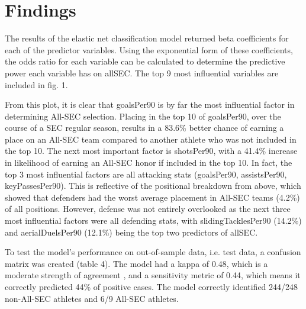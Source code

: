 \documentclass{article}
\begin{document}
\section{Findings}
The results of the elastic net classification model returned beta coefficients for each of the predictor variables. Using the exponential form of these coefficients, the odds ratio for each variable can be calculated to determine the predictive power each variable has on allSEC. The top 9 most influential variables are included in fig. 1.

From this plot, it is clear that goalsPer90 is by far the most influential factor in determining All-SEC selection. Placing in the top 10 of goalsPer90, over the course of a SEC regular season, results in a 83.6\% better chance of earning a place on an All-SEC team compared to another athlete who was not included in the top 10. The next most important factor is shotsPer90, with a 41.4\% increase in likelihood of earning an All-SEC honor if included in the top 10. In fact, the top 3 most influential factors are all attacking stats (goalsPer90, assistsPer90, keyPassesPer90). This is reflective of the positional breakdown from above, which showed that defenders had the worst average placement in All-SEC teams (4.2\%) of all positions. However, defense was not entirely overlooked as the next three most influential factors were all defending stats, with slidingTacklesPer90 (14.2\%) and aerialDuelsPer90 (12.1\%) being the top two predictors of allSEC. 

To test the model’s performance on out-of-sample data, i.e. test data, a confusion matrix was created (table 4). The model had a kappa of 0.48, which is a moderate strength of agreement \cite{landis1977}, and a sensitivity metric of 0.44, which means it correctly predicted 44\% of positive cases. The model correctly identified 244/248 non-All-SEC athletes and 6/9 All-SEC athletes. 
\end{document}
